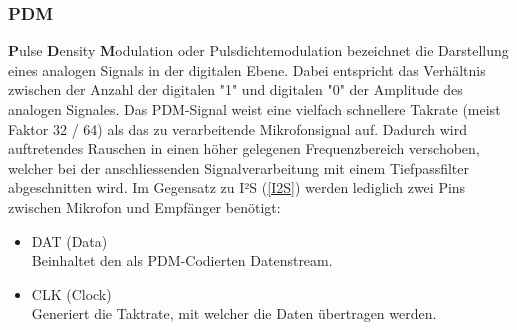 \documentclass[12pt]{article}
\begin{document}
	\subsubsection*{PDM} \label{PDM}
	\textbf{P}ulse \textbf{D}ensity \textbf{M}odulation oder Pulsdichtemodulation bezeichnet die Darstellung eines analogen Signals in der digitalen Ebene. Dabei entspricht das Verhältnis zwischen der Anzahl der digitalen "1" und digitalen "0" der Amplitude des analogen Signales. Das PDM-Signal weist eine vielfach schnellere Takrate (meist Faktor 32 / 64) als das zu verarbeitende Mikrofonsignal auf. Dadurch wird auftretendes Rauschen in einen höher gelegenen Frequenzbereich verschoben, welcher bei der anschliessenden Signalverarbeitung mit einem Tiefpassfilter abgeschnitten wird. Im Gegensatz zu I²S (\ref{I2S}) werden lediglich zwei Pins zwischen Mikrofon und Empfänger benötigt:
	\begin{itemize}
		\item \color{red}DAT \color{black} \quad (Data) \\
		Beinhaltet den als PDM-Codierten Datenstream.
		\item CLK \quad (Clock) \\
		Generiert die Taktrate, mit welcher die Daten übertragen werden.
	\end{itemize}
\end{document}
